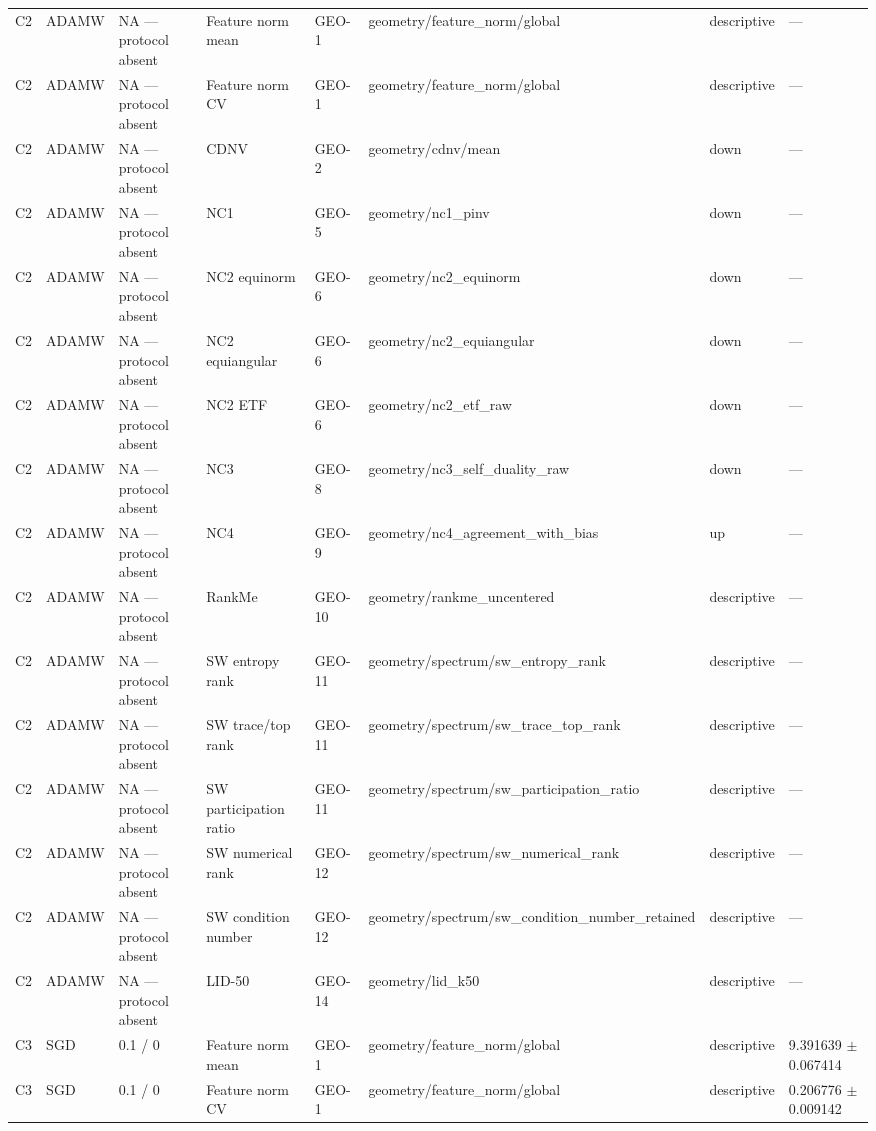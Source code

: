\begin{longtable}{llllllll}
C2 & ADAMW & NA — protocol absent & Feature norm mean & GEO-1 & geometry/feature\_norm/global & descriptive & — \\
C2 & ADAMW & NA — protocol absent & Feature norm CV & GEO-1 & geometry/feature\_norm/global & descriptive & — \\
C2 & ADAMW & NA — protocol absent & CDNV & GEO-2 & geometry/cdnv/mean & down & — \\
C2 & ADAMW & NA — protocol absent & NC1 & GEO-5 & geometry/nc1\_pinv & down & — \\
C2 & ADAMW & NA — protocol absent & NC2 equinorm & GEO-6 & geometry/nc2\_equinorm & down & — \\
C2 & ADAMW & NA — protocol absent & NC2 equiangular & GEO-6 & geometry/nc2\_equiangular & down & — \\
C2 & ADAMW & NA — protocol absent & NC2 ETF & GEO-6 & geometry/nc2\_etf\_raw & down & — \\
C2 & ADAMW & NA — protocol absent & NC3 & GEO-8 & geometry/nc3\_self\_duality\_raw & down & — \\
C2 & ADAMW & NA — protocol absent & NC4 & GEO-9 & geometry/nc4\_agreement\_with\_bias & up & — \\
C2 & ADAMW & NA — protocol absent & RankMe & GEO-10 & geometry/rankme\_uncentered & descriptive & — \\
C2 & ADAMW & NA — protocol absent & SW entropy rank & GEO-11 & geometry/spectrum/sw\_entropy\_rank & descriptive & — \\
C2 & ADAMW & NA — protocol absent & SW trace/top rank & GEO-11 & geometry/spectrum/sw\_trace\_top\_rank & descriptive & — \\
C2 & ADAMW & NA — protocol absent & SW participation ratio & GEO-11 & geometry/spectrum/sw\_participation\_ratio & descriptive & — \\
C2 & ADAMW & NA — protocol absent & SW numerical rank & GEO-12 & geometry/spectrum/sw\_numerical\_rank & descriptive & — \\
C2 & ADAMW & NA — protocol absent & SW condition number & GEO-12 & geometry/spectrum/sw\_condition\_number\_retained & descriptive & — \\
C2 & ADAMW & NA — protocol absent & LID-50 & GEO-14 & geometry/lid\_k50 & descriptive & — \\
C3 & SGD & 0.1 / 0 & Feature norm mean & GEO-1 & geometry/feature\_norm/global & descriptive & 9.391639 $\pm$ 0.067414 \\
C3 & SGD & 0.1 / 0 & Feature norm CV & GEO-1 & geometry/feature\_norm/global & descriptive & 0.206776 $\pm$ 0.009142 \\

\end{longtable}
